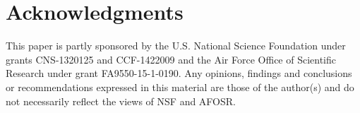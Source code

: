 \documentclass[10pt, conference,compsoc]{IEEEtran}
\begin{document}
\IEEEpeerreviewmaketitle









%









\section*{Acknowledgments}

This paper is partly sponsored by the U.S. National Science Foundation 
under grants CNS-1320125 and CCF-1422009 
and the Air Force Office of Scientific Research under grant FA9550-15-1-0190. 
Any opinions, findings and conclusions or recommendations expressed in this material 
are those of the author(s) and do not necessarily reflect the views of NSF and AFOSR.



\end{document}
